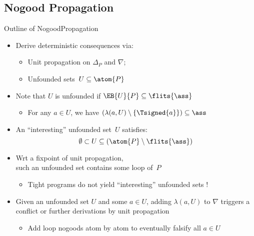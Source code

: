\subsection{Nogood Propagation}
\begin{frame}{Outline of {NogoodPropagation}}
\begin{itemize}
\item Derive deterministic consequences via:
  \begin{itemize}
  \item Unit propagation on $\Delta_P$ and $\nabla$;
  \item Unfounded sets~$U\subseteq\atom{P}$
  \end{itemize}
\item Note that $U$ is \alert{unfounded} if $\EB{U}{P}\subseteq\flits{\ass}$
  \begin{itemize}
  \item {} For any $a\in U$, we have $(\lambda(a,U)\setminus\{\Tsigned{a}\})\subseteq\ass$
  \end{itemize}
\pause
\item An ``interesting'' unfounded set~$U$ satisfies:
\[
  \emptyset\subset U \subseteq (\atom{P}\setminus\flits{\ass})
\]
\item Wrt a fixpoint of unit propagation,\\
\pause
      such an unfounded set contains some loop of~$P$
  \begin{itemize}
  \item {} Tight programs do not yield ``interesting'' unfounded sets !
  \end{itemize}
\pause
\item Given an unfounded set $U$ and some $a\in U$,
      adding $\lambda(a,U)$ to $\nabla$ triggers a conflict or
      further derivations by unit propagation
  \begin{itemize}
  \item {} Add loop nogoods atom by atom to eventually falsify all $a\in U$
  \end{itemize}
\end{itemize}
\end{frame}
\begin{frame}[c]
\SetAlFnt{\tiny}

\end{frame}
